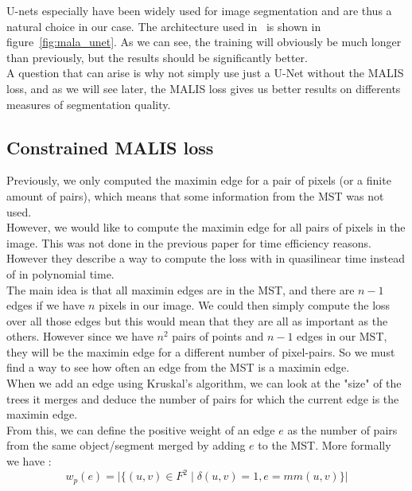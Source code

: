 U-nets especially have been widely used for image segmentation and are thus a
natural choice in our case. The architecture used in~\cite{funke_large_2019}
is shown in figure~\ref{fig:mala_unet}. As we can see, the training will
obviously be much longer than previously, but the results should be
significantly better.\\
A question that can arise is why not simply use just a U-Net without the MALIS
loss, and as we will see later, the MALIS loss gives us better results on
differents measures of segmentation quality.


\subsection{Constrained MALIS loss}

Previously, we only computed the maximin edge for a pair of pixels (or a finite
amount of pairs), which means that some information from the MST was not
used.\\
However, we would like to compute the maximin edge for all pairs of pixels in
the image. This was not done in the previous paper for time efficiency
reasons.\\
However they describe a way to compute the loss with in quasilinear time instead
of in polynomial time.\\

The main idea is that all maximin edges are in the MST, and there are $n-1$
edges if we have $n$ pixels in our image. We could then simply compute the loss
over all those edges but this would mean that they are all as important as the
others. However since we have $n^2$ pairs of points and $n-1$ edges in our MST,
they will be the maximin edge for a different number of pixel-pairs. So we must
find a way to see how often an edge from the MST is a maximin edge.\\

When we add an edge using Kruskal's algorithm, we can look at the "size" of the
trees it merges and deduce the number of pairs for which the current edge is
the maximin edge.\\

From this, we can define the positive weight of an edge $e$ as the number of pairs
from the same object/segment merged by adding $e$ to the MST. More formally we
have :
\begin{equation*}
	w_p(e)=\lvert \{(u,v)\in F^2 \;|\;\delta(u,v)=1, e=mm(u,v) \}   \rvert
\end{equation*}

